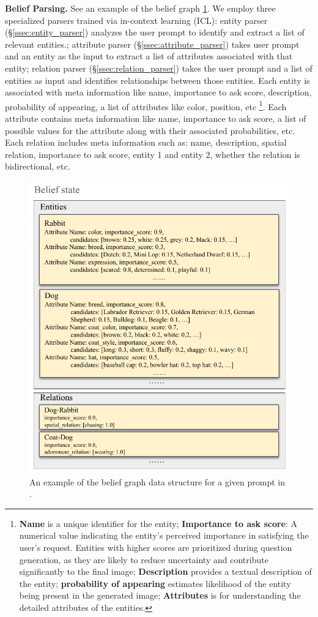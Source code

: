 \textbf{Belief Parsing.} See an example of the belief graph \cref{fig:belief_state_example}. We employ three specialized parsers trained via in-context learning (ICL): entity parser (\S\ref{ssec:entity_parser}) analyzes the user prompt to identify and extract a list of relevant entities.; attribute parser (\S\ref{ssec:attribute_parser}) takes user prompt and an entity as the input to extract a list of attributes associated with that entity; relation parser (\S\ref{ssec:relation_parser}) takes the user prompt and a list of entities as input and identifies relationships between those entities. Each entity is associated with meta information like name, importance to ask score, description, probability of appearing, a list of attributes like color, position, etc \footnote{\textbf{Name} is a unique identifier for the entity; \textbf{Importance to ask score}: A numerical value indicating the entity's perceived importance in satisfying the user's request. Entities with higher scores are prioritized during question generation, as they are likely to reduce uncertainty and contribute significantly to the final image; \textbf{Description} provides a textual description of the entity; \textbf{probability of appearing} estimates likelihood of the entity being present in the generated image; \textbf{Attributes} is for understanding the detailed attributes of the entities.}. Each attribute contains meta information like name, importance to ask score, a list of possible values for the attribute along with their associated probabilities, etc. Each relation includes meta information such as: name, description, spatial relation, importance to ask score, entity 1 and entity 2, whether the relation is bidirectional, etc. 

\begin{figure}
    \centering
    \includegraphics[width=.8\linewidth]{figures/Belief_state_visualization.pdf}
    \caption{An example of the belief graph data structure for a given prompt in .}
    \label{fig:belief_state_example}
\end{figure}


